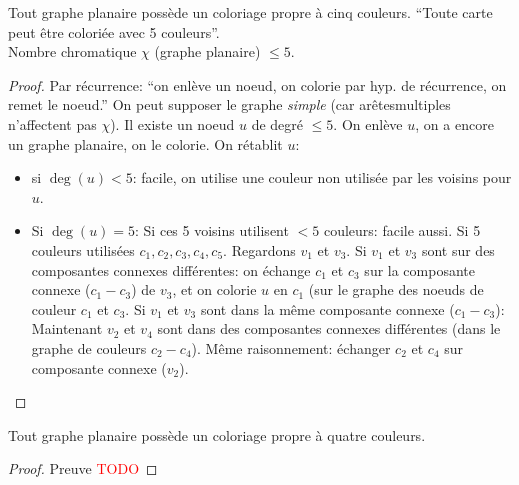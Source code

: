 \begin{mytheo} [Kempe]
  Tout graphe planaire possède un coloriage propre à cinq couleurs.
  ``Toute carte peut être coloriée avec 5 couleurs''.\\
  Nombre chromatique $\chi$ (graphe planaire) $\leq 5$.
  \begin{proof}
    Par récurrence: ``on enlève un noeud, on colorie par hyp. de récurrence, on remet le noeud.''
    On peut supposer le graphe \emph{simple} (car arêtesmultiples n'affectent pas $\chi$).
    Il existe un noeud $u$ de degré $\leq 5$.
    On enlève $u$, on a encore un graphe planaire, on le colorie.
    On rétablit $u$:
    \begin{itemize}
      \item si $\deg(u) < 5$: facile, on utilise une couleur non utilisée par les voisins pour $u$.
      \item Si $\deg(u) = 5$: Si ces 5 voisins utilisent $< 5$ couleurs: facile aussi.
        Si 5 couleurs utilisées $c_1, c_2, c_3, c_4, c_5$.
        Regardons $v_1$ et $v_3$. Si $v_1$ et $v_3$ sont sur des composantes connexes différentes: on échange $c_1$ et $c_3$ sur
        la composante connexe ($c_1-c_3$) de $v_3$, et on colorie $u$ en $c_1$ (sur le graphe des noeuds de couleur $c_1$ et $c_3$.
        Si $v_1$ et $v_3$ sont dans la même composante connexe ($c_1-c_3$):
        Maintenant $v_2$ et $v_4$ sont dans des composantes connexes
        différentes (dans le graphe de couleurs $c_2-c_4$).
        Même raisonnement: échanger $c_2$ et $c_4$ sur composante connexe ($v_2$).
    \end{itemize}
  \end{proof}
\end{mytheo}

\begin{mytheo} 
  Tout graphe planaire possède un coloriage propre à quatre couleurs.
  \begin{proof}
    Preuve \textcolor{red}{TODO}
  \end{proof}
\end{mytheo}
